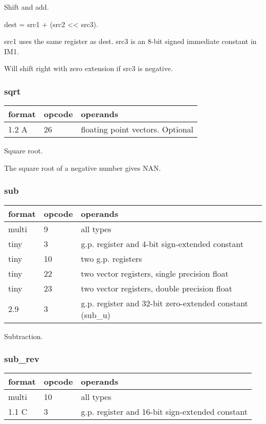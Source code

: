 \documentclass[forwardcom.tex]{subfiles}
\begin{document}
Shift and add. 
\vspace{2mm}

dest = src1 + (src2 \textless\textless{}  src3).
\vspace{2mm}

src1 uses the same register as dest. src3 is an 8-bit signed immediate constant in IM1.
\vspace{2mm}

Will shift right with zero extension if src3 is negative.

\subsubsection{sqrt}
\label{table:sqrtInstruction}
\begin{tabular}{|p{12mm}|p{12mm}|p{110mm}|}
\hline
\bfseries format & \bfseries opcode & \bfseries operands \\ \hline
1.2 A & 26 & floating point vectors. Optional \\ \hline
\end{tabular}
\vspace{2mm}

Square root.
\vspace{2mm}

The square root of a negative number gives NAN.

\subsubsection{sub}
\label{table:subInstruction}
\begin{tabular}{|p{12mm}|p{12mm}|p{110mm}|}
\hline
\bfseries format & \bfseries opcode & \bfseries operands \\ \hline
multi &  9 & all types \\ \hline
tiny  &  3 & g.p. register and 4-bit sign-extended constant \\ \hline
tiny  & 10 & two g.p. registers \\ \hline
tiny  & 22 & two vector registers, single precision float \\ \hline
tiny  & 23 & two vector registers, double precision float \\ \hline
2.9   &  3 & g.p. register and 32-bit zero-extended constant (sub\_u) \\ \hline
\end{tabular}
\vspace{2mm}

Subtraction.

\subsubsection{sub\_rev}
\label{table:subRevInstruction}
\begin{tabular}{|p{12mm}|p{12mm}|p{110mm}|}
\hline
\bfseries format & \bfseries opcode & \bfseries operands \\ \hline
multi & 10 & all types \\ \hline
1.1 C &  3 & g.p. register and 16-bit sign-extended constant \\ \hline
\end{tabular}
\vspace{2mm}
\end{document}
